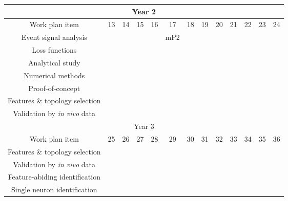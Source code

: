 \documentclass[a4paper,11pt]{scrartcl}
\begin{document}
\begin{table}[h!]
\begin{tabular}{|c|c|c|c|c|c|c|c|c|c|c|c|c|}
    \hline
    \multicolumn{13}{|c|}{\cellcolor{gray!50}Year 2} \\
        \hline
        Work plan item & 13 & 14 & 15 & 16 & 17 & 18 & 19 & 20 & 21 & 22 & 23 & 24\\
        \hline
        Event signal analysis & \cellcolor{blue!25} & \cellcolor{blue!25} & \cellcolor{blue!25} & \cellcolor{blue!25} & \cellcolor{blue!25} mP2 & & & & & & & \\
        \hline
        Loss functions & & \cellcolor{purple!25} & \cellcolor{purple!25} & & & & & & & & & \\
        \hline
        Analytical study & & & & \cellcolor{purple!25} & \cellcolor{purple!25} & \cellcolor{purple!25} & \cellcolor{purple!25} &  & & & & \\
        \hline
        Numerical methods & & & & & & \cellcolor{purple!25} & \cellcolor{purple!25} & \cellcolor{purple!25} & \cellcolor{purple!25} & & & \\
        \hline
        Proof-of-concept & & & & & & & & \cellcolor{purple!25} & \cellcolor{purple!25} & \cellcolor{purple!25} & \cellcolor{purple!25} & \\
        \hline
        Features \& topology selection & & & & \cellcolor{green!25} & \cellcolor{green!25} & \cellcolor{green!25} & & & & \cellcolor{green!25} & \cellcolor{green!25} & \cellcolor{green!25} \\
        \hline
        Validation by \textit{in vivo} data & & & & & & & \cellcolor{green!25} & \cellcolor{green!25} & \cellcolor{green!25} & & & \\
    \hline  
    \multicolumn{13}{|c|}{\cellcolor{gray!50}Year 3} \\
        \hline
        Work plan item & 25 & 26 & 27 & 28 & 29 & 30 & 31 & 32 & 33 & 34 & 35 & 36 \\
        \hline
        Features \& topology selection & & & & & \cellcolor{green!25} & \cellcolor{green!25} & & \cellcolor{green!25} & & & & \\
        \hline
        Validation by \textit{in vivo} data & \cellcolor{green!25} &  \cellcolor{green!25} & & & & & \cellcolor{green!25} & \cellcolor{green!25} & & & & \\
        \hline
        Feature-abiding identification & \cellcolor{orange!25} & \cellcolor{orange!25} & \cellcolor{orange!25} & \cellcolor{orange!25} & & & & & & & & \\
        \hline
        Single neuron identification & & & & \cellcolor{orange!25} & \cellcolor{orange!25} & \cellcolor{orange!25} & \cellcolor{orange!25} & & & & & \\

\end{tabular}
\end{table}
\end{document}
